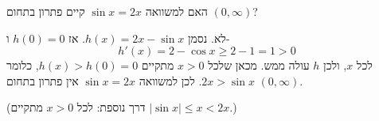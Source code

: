 האם למשוואה $\sin x = 2x$ קיים פתרון בתחום \((0, \infty)\)?
\begin{solbox}
\unverified
לא.
נסמן
$h(x)=2x-\sin x$.
אז
$h(0)=0$
ו-
$$h'(x)=2-\cos x\geq 2-1=1>0$$
לכל
$x$,
ולכן
$h$
עולה ממש. מכאן שלכל
$x>0$
מתקיים
$h(x)>h(0)=0$,
כלומר
$2x>\sin x$.
לכן למשוואה
$\sin x=2x$
אין פתרון בתחום
$(0,\infty)$.

(דרך נוספת: לכל
$x>0$
מתקיים
$|\sin x|\leq x<2x$.)
\end{solbox}
